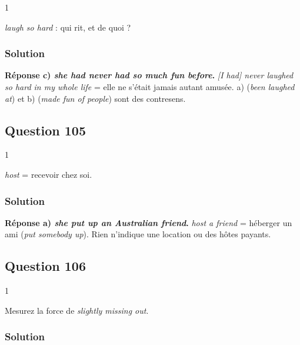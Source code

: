 \documentclass[11pt,a4paper]{article}
\begin{document}
\begin{indication}{1}

\emph{laugh so hard} : qui rit, et de quoi ?

\end{indication}

\hypertarget{solution-103}{%
\subsubsection{Solution}\label{solution-103}}

\textbf{Réponse c) \emph{she had never had so much fun before}.} \emph{{[}I had{]} never laughed so hard in my whole life} = elle ne s'était jamais autant amusée. a) (\emph{been laughed at}) et b) (\emph{made fun of people}) sont des contresens.

\hypertarget{question-105}{%
\subsection{Question 105}\label{question-105}}

\begin{indication}{1}

\emph{host} = recevoir chez soi.

\end{indication}

\hypertarget{solution-104}{%
\subsubsection{Solution}\label{solution-104}}

\textbf{Réponse a) \emph{she put up an Australian friend}.} \emph{host a friend} = héberger un ami (\emph{put somebody up}). Rien n'indique une location ou des hôtes payants.

\hypertarget{question-106}{%
\subsection{Question 106}\label{question-106}}

\begin{indication}{1}

Mesurez la force de \emph{slightly missing out}.

\end{indication}

\hypertarget{solution-105}{%
\subsubsection{Solution}\label{solution-105}}
\end{document}
